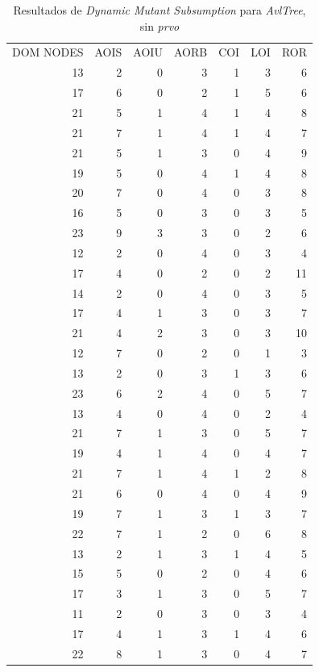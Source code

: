 \begin{table}[]
	\caption{Resultados de \emph{Dynamic Mutant Subsumption} para \emph{AvlTree}, sin \emph{prvo}}
	\label{tables.results.subsumption.avltree.noprvo}
	\centering
	\scriptsize
	\def\arraystretch{0.95}
	\setlength\tabcolsep{0.5mm}
	\begin{tabular}{rrrrrrr}
		DOM NODES & AOIS & AOIU & AORB & COI & LOI & ROR \\
		13 & 2 & 0 & 3 & 1 & 3 & 6 \\
		17 & 6 & 0 & 2 & 1 & 5 & 6 \\
		21 & 5 & 1 & 4 & 1 & 4 & 8 \\
		21 & 7 & 1 & 4 & 1 & 4 & 7 \\
		21 & 5 & 1 & 3 & 0 & 4 & 9 \\
		19 & 5 & 0 & 4 & 1 & 4 & 8 \\
		20 & 7 & 0 & 4 & 0 & 3 & 8 \\
		16 & 5 & 0 & 3 & 0 & 3 & 5 \\
		23 & 9 & 3 & 3 & 0 & 2 & 6 \\
		12 & 2 & 0 & 4 & 0 & 3 & 4 \\
		17 & 4 & 0 & 2 & 0 & 2 & 11 \\
		14 & 2 & 0 & 4 & 0 & 3 & 5 \\
		17 & 4 & 1 & 3 & 0 & 3 & 7 \\
		21 & 4 & 2 & 3 & 0 & 3 & 10 \\
		12 & 7 & 0 & 2 & 0 & 1 & 3 \\
		13 & 2 & 0 & 3 & 1 & 3 & 6 \\
		23 & 6 & 2 & 4 & 0 & 5 & 7 \\
		13 & 4 & 0 & 4 & 0 & 2 & 4 \\
		21 & 7 & 1 & 3 & 0 & 5 & 7 \\
		19 & 4 & 1 & 4 & 0 & 4 & 7 \\
		21 & 7 & 1 & 4 & 1 & 2 & 8 \\
		21 & 6 & 0 & 4 & 0 & 4 & 9 \\
		19 & 7 & 1 & 3 & 1 & 3 & 7 \\
		22 & 7 & 1 & 2 & 0 & 6 & 8 \\
		13 & 2 & 1 & 3 & 1 & 4 & 5 \\
		15 & 5 & 0 & 2 & 0 & 4 & 6 \\
		17 & 3 & 1 & 3 & 0 & 5 & 7 \\
		11 & 2 & 0 & 3 & 0 & 3 & 4 \\
		17 & 4 & 1 & 3 & 1 & 4 & 6 \\
		22 & 8 & 1 & 3 & 0 & 4 & 7
	\end{tabular}
\end{table}

